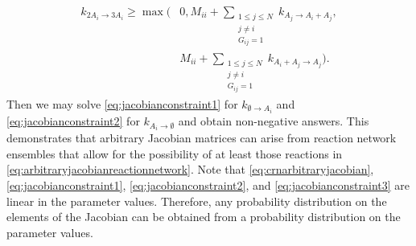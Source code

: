 \begin{equation}
\begin{aligned}
k_{2A_i \to 3A_i} \ge \max \bigg(&0, M_{ii} + \sum_{\substack{1 \le j \le N \\ j \neq i \\ G_{ij} = 1}} k_{A_j \to A_i + A_j}, \\
&M_{ii} + \sum_{\substack{1 \le j \le N \\ j \neq i \\ G_{ij} = 1}} k_{A_i + A_j \to A_j} \bigg).
\end{aligned}
\end{equation}
Then we may solve \ref{eq:jacobianconstraint1} for $k_{\emptyset \to A_i}$ and \ref{eq:jacobianconstraint2} for $k_{A_i \to \emptyset}$ and obtain non-negative answers. This demonstrates that arbitrary Jacobian matrices can arise from reaction network ensembles that allow for the possibility of at least those reactions in \ref{eq:arbitraryjacobianreactionnetwork}. Note that \ref{eq:crnarbitraryjacobian}, \ref{eq:jacobianconstraint1}, \ref{eq:jacobianconstraint2}, and \ref{eq:jacobianconstraint3} are linear in the parameter values. Therefore, any probability distribution on the elements of the Jacobian can be obtained from a probability distribution on the parameter values.
